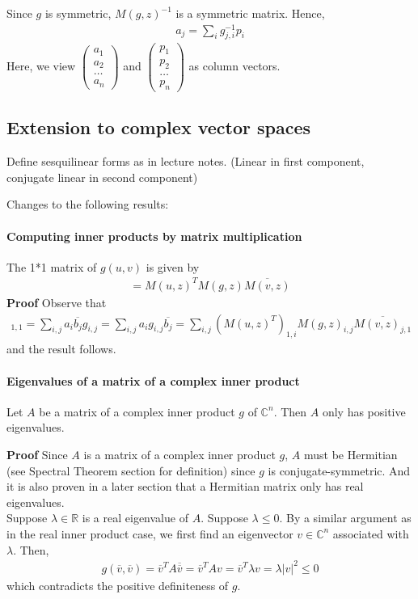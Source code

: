 \documentclass{article}
\begin{document}
Since $g$ is symmetric, $M(g,z)^{-1}$ is a symmetric matrix.
Hence, 
\begin{align*}
	a_j=\sum_i g^{-1}_{j,i}p_i 
\end{align*}
Here, we view $\begin{pmatrix}
a_1\\ a_2\\ \dots \\ a_n
\end{pmatrix}$ and $\begin{pmatrix}
p_1\\ p_2\\ \dots \\ p_n
\end{pmatrix}$ as column vectors.

\subsection{Extension to complex vector spaces}
Define sesquilinear forms as in lecture notes. (Linear in first component, conjugate linear in second component)

Changes to the following results:
\paragraph{Computing inner products by matrix multiplication}
The 1*1 matrix of $g(u,v)$ is given by
\begin{align*}
	[g(u,v)] = M(u,z)^TM(g,z)\overline{M(v,z)}
\end{align*}
\textbf{Proof} Observe that 
\begin{align*}
	[g(u,v)]_{1,1} = \sum_{i,j}a_i\overline{b_j} g_{i,j} = \sum_{i,j}a_ig_{i,j}\overline{b_j} = \sum_{i,j}(M(u,z)^T)_{1,i} M(g,z)_{i,j} \overline{M(v,z)_{j,1}}
\end{align*}
and the result follows.

\paragraph{Eigenvalues of a matrix of a complex inner product} Let $A$ be a matrix of a complex inner product $g$ of $\mathbb{C}^n$. Then $A$ only has positive eigenvalues.

\textbf{Proof} Since $A$ is a matrix of a complex inner product $g$, $A$ must be Hermitian (see Spectral Theorem section for definition) since $g$ is conjugate-symmetric. And it is also proven in a later section that a Hermitian matrix only has real eigenvalues.\\
Suppose $\lambda \in \mathbb{R}$ is a real eigenvalue of $A$. Suppose $\lambda \leq 0$. By a similar argument as in the real inner product case, we first find an eigenvector $v\in \mathbb{C}^n$ associated with $\lambda$. Then,
\begin{align*}
	g(\overline{v}, \overline{v}) = \overline{v}^TA\overline{\overline{v}}=\overline{v}^TAv=\overline{v}^T\lambda v = \lambda |v|^2 \leq 0
\end{align*} 
which contradicts the positive definiteness of $g$.
\end{document}
